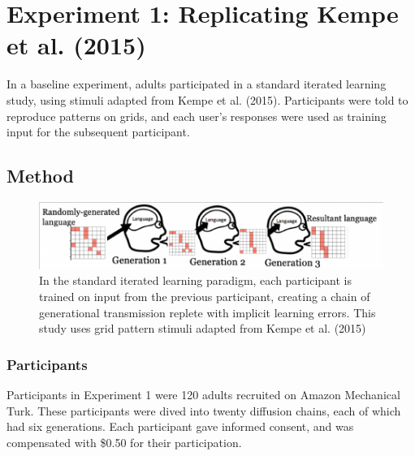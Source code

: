 \documentclass[10pt, letterpaper]{article}
\newenvironment{CodeChunk}{}{}
\begin{document}
\hypertarget{experiment-1-replicating-kempe-2015}{%
\section{Experiment 1: Replicating Kempe et al.
(2015)}\label{experiment-1-replicating-kempe-2015}}

In a baseline experiment, adults participated in a standard iterated
learning study, using stimuli adapted from Kempe et al. (2015).
Participants were told to reproduce patterns on grids, and each user's
responses were used as training input for the subsequent participant.

\hypertarget{method}{%
\subsection{Method}\label{method}}

\begin{CodeChunk}
\begin{figure}[tb]

{\centering \includegraphics{figs/ill_outline-1} 

}

\caption[In the standard iterated learning paradigm, each participant is trained on input from the previous participant, creating a chain of generational transmission replete with implicit learning errors]{In the standard iterated learning paradigm, each participant is trained on input from the previous participant, creating a chain of generational transmission replete with implicit learning errors. This study uses grid pattern stimuli adapted from Kempe et al. (2015)}\label{fig:ill_outline}
\end{figure}
\end{CodeChunk}

\hypertarget{participants}{%
\subsubsection{Participants}\label{participants}}

Participants in Experiment 1 were 120 adults recruited on Amazon
Mechanical Turk. These participants were dived into twenty diffusion
chains, each of which had six generations. Each participant gave
informed consent, and was compensated with \$0.50 for their
participation.
\end{document}

